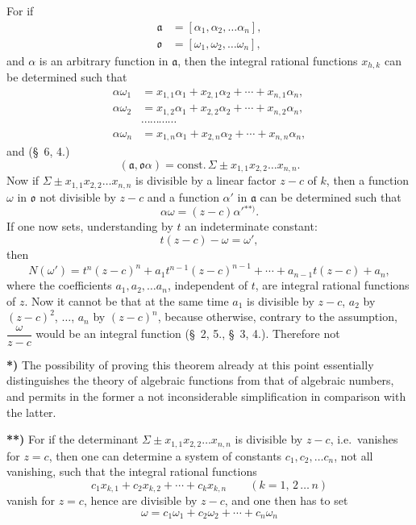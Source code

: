 \documentclass{article}
\begin{document}
For if
\[ \begin{aligned} \mathfrak{a} &= [\alpha_{1}, \alpha_{2}, \ldots \alpha_{n}], \\ \mathfrak{o} &= [\omega_{1}, \omega_{2}, \ldots \omega_{n}], \end{aligned} \]
and $\alpha$ is an arbitrary function in $\mathfrak{a}$, then the integral rational functions $x_{h,k}$ can be determined such that
\[ \begin{aligned} \alpha\omega_{1} &= x_{1,1}\alpha_{1} + x_{2,1}\alpha_{2} + \cdots + x_{n,1}\alpha_{n}, \\ \alpha\omega_{2} &= x_{1,2}\alpha_{1} + x_{2,2}\alpha_{2} + \cdots + x_{n,2}\alpha_{n}, \\ &\cdots\cdots\cdots\cdots \\ \alpha\omega_{n} &= x_{1,n}\alpha_{1} + x_{2,n}\alpha_{2} + \cdots + x_{n,n}\alpha_{n}, \end{aligned} \]
and (§~6, 4.)
\[ (\mathfrak{a}, \mathfrak{o}\alpha) = \text{const.}\,\Sigma \pm x_{1,1}x_{2,2}\ldots x_{n,n}. \]
Now if $\Sigma \pm x_{1,1}x_{2,2}\ldots x_{n,n}$ is divisible by a linear factor $z-c$ of $k$, then a function $\omega$ in $\mathfrak{o}$ not divisible by $z-c$ and a function $\alpha'$ in $\mathfrak{a}$ can be determined such that
\[ \alpha\omega = (z-c)\alpha'{}^{**)}. \]
If one now sets, understanding by $t$ an indeterminate constant:
\[ t(z-c) - \omega = \omega', \]
then
\[ N(\omega') = t^{n}(z-c)^{n} + a_{1}t^{n-1}(z-c)^{n-1} + \cdots + a_{n-1}t(z-c) + a_{n}, \]
where the coefficients $a_{1}, a_{2}, \ldots a_{n}$, independent of $t$, are integral rational functions of $z$. Now it cannot be that at the same time $a_{1}$ is divisible by $z-c$, $a_{2}$ by $(z-c)^{2}$, $\ldots$, $a_{n}$ by $(z-c)^{n}$, because otherwise, contrary to the assumption, $\dfrac{\omega}{z-c}$ would be an integral function (§~2, 5., §~3, 4.). Therefore not

\textbf{*)} The possibility of proving this theorem already at this point essentially distinguishes the theory of algebraic functions from that of algebraic numbers, and permits in the former a not inconsiderable simplification in comparison with the latter.

\textbf{**)} For if the determinant $\Sigma \pm x_{1,1}x_{2,2}\ldots x_{n,n}$ is divisible by $z-c$, i.e.\ vanishes for $z = c$, then one can determine a system of constants $c_{1}, c_{2}, \ldots c_{n}$, not all vanishing, such that the integral rational functions
\[ c_{1}x_{k,1} + c_{2}x_{k,2} + \cdots + c_{k}x_{k,n} \qquad {\scriptstyle (k = 1,\, 2\, \ldots\, n)} \]
vanish for $z = c$, hence are divisible by $z-c$, and one then has to set
\[ \omega = c_{1}\omega_{1} + c_{2}\omega_{2} + \cdots + c_{n}\omega_{n} \]
\end{document}
